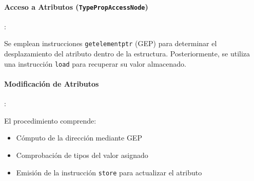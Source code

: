 \documentclass{article}
\begin{document}
\paragraph{Acceso a Atributos (\texttt{TypePropAccessNode})}:

Se emplean instrucciones \texttt{getelementptr} (GEP) para determinar el desplazamiento del atributo dentro de la estructura. Posteriormente, se utiliza una instrucción \texttt{load} para recuperar su valor almacenado.

\paragraph{Modificación de Atributos} :

El procedimiento comprende:
\begin{itemize}
    \item Cómputo de la dirección mediante GEP
    \item Comprobación de tipos del valor asignado
    \item Emisión de la instrucción \texttt{store} para actualizar el atributo
\end{itemize}
\end{document}
